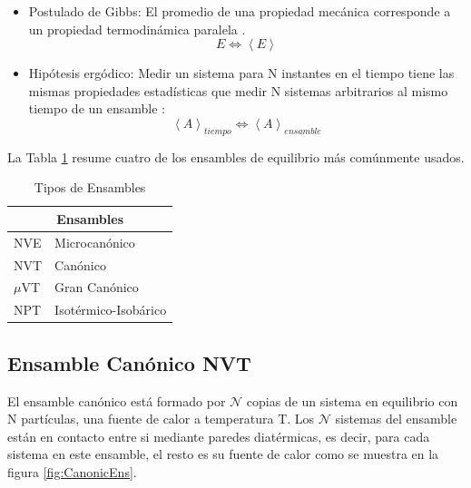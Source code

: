 \begin{itemize}
    \item Postulado de Gibbs: El promedio de una propiedad mecánica corresponde a un propiedad termodinámica paralela \cite{mcquarrie1976}.\\
    
    \begin{equation}
        E \Longleftrightarrow \left \langle E \right \rangle
    \end{equation}
    
    \item Hipótesis ergódico: Medir un sistema para N instantes en el tiempo tiene las mismas propiedades estadísticas que medir N sistemas arbitrarios al mismo tiempo de un ensamble \cite{mcquarrie1976}:
    \begin{equation}
        \left \langle A \right \rangle_{tiempo} \Longleftrightarrow \left \langle A \right \rangle_{ensamble}
    \end{equation}
\end{itemize}


La Tabla \ref{tiposEnsamble} resume cuatro de los ensambles de equilibrio más comúnmente usados.

\begin{table}[h!]
    \centering
    \begin{tabular}{ |p{1cm}||p{4cm}|  }
    \hline
    \multicolumn{2}{|c|}{Ensambles} \\
    \hline
    NVE   & Microcanónico \\
    NVT   & Canónico \\
    $\mu$VT& Gran Canónico \\
    NPT   & Isotérmico-Isobárico \\
    \hline
    \end{tabular}
    \caption{Tipos de Ensambles}
    \label{tiposEnsamble}
\end{table}

\subsection{Ensamble Canónico NVT}

El ensamble canónico está formado por $\mathcal{N}$ copias de un sistema en equilibrio con N partículas, una fuente de calor a temperatura T. Los $\mathcal{N}$ sistemas del ensamble están en contacto entre si mediante paredes diatérmicas, es decir, para cada sistema en este ensamble, el resto es su fuente de calor como se muestra en la figura \ref{fig:CanonicEns}.\\

